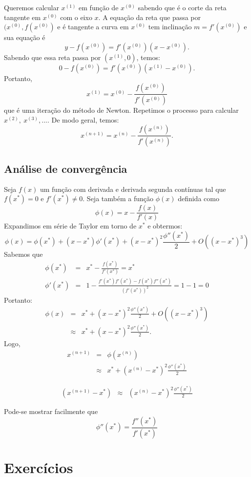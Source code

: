 Queremos calcular $x^{(1)}$ em função de $x^{(0)}$ sabendo que é o corte da reta tangente em $x^{(0)}$ com o eixo $x$. A equação da reta que passa por $(x^{(0)}, f(x^{(0)})$ e é tangente a curva em $x^{(0)}$ tem inclinação $m=f'(x^{(0)})$ e sua equação é
$$
y-f(x^{(0)})=f'(x^{(0)})(x-x^{(0)}).
$$
Sabendo que essa reta passa por $(x^{(1)},0)$, temos:
$$
0-f(x^{(0)})=f'(x^{(0)})(x^{(1)}-x^{(0)}).
$$
Portanto,
$$x^{(1)}=x^{(0)}-\frac{f(x^{(0)})}{f'(x^{(0)})}$$
que é uma iteração do método de Newton. Repetimos o processo para calcular $x^{(2)},\ x^{(3)},...$. De modo geral, temos:
$$x^{(n+1)}=x^{(n)}-\frac{f(x^{(n)})}{f'(x^{(n)})}.$$

\subsection{Análise de convergência}

Seja $f(x)$ um função com derivada e derivada segunda contínuas tal que $f(x^*)=0$ e $f'(x^*)\neq 0$. Seja também a função $\phi(x)$ definida como
$$\phi(x)=x-\frac{f(x)}{f'(x)}$$
Expandimos em série de Taylor em torno de $x^*$ e obtermos:
$$\phi(x)=\phi(x^*)+(x-x^*)\phi'(x^*)+ (x-x^*)^2\frac{\phi''(x^*)}{2}+O\left((x-x^*)^3\right)$$
Sabemos que
\begin{eqnarray*}
\phi(x^*)&=&x^*-\frac{f(x^*)}{f'(x^*)}=x^*\\
\phi'(x^*)&=&1-\frac{f'(x^*)f'(x^*)-f(x^*)f''(x^*)}{\left(f'(x^*)\right)^2}=1-1=0
\end{eqnarray*}
Portanto:
\begin{eqnarray*}
\phi(x)&=&x^*+ (x-x^*)^2\frac{\phi''(x^*)}{2}+O\left((x-x^*)^3\right)\\
&\approx&x^*+ (x-x^*)^2\frac{\phi''(x^*)}{2}.
\end{eqnarray*}
Logo,
\begin{eqnarray*}
x^{(n+1)}&=&\phi(x^{(n)})\\
&\approx& x^*+ (x^{(n)}-x^*)^2\frac{\phi''(x^*)}{2}
\end{eqnarray*}

\begin{eqnarray*}
\left(x^{(n+1)}-x^*\right) &\approx& (x^{(n)}-x^*)^2\frac{\phi''(x^*)}{2}
\end{eqnarray*}

\begin{obs} Pode-se mostrar facilmente que
$$\phi''(x^*)=\frac{f''(x^*)}{f'(x^*)}$$
\end{obs}

\section*{Exercícios}

